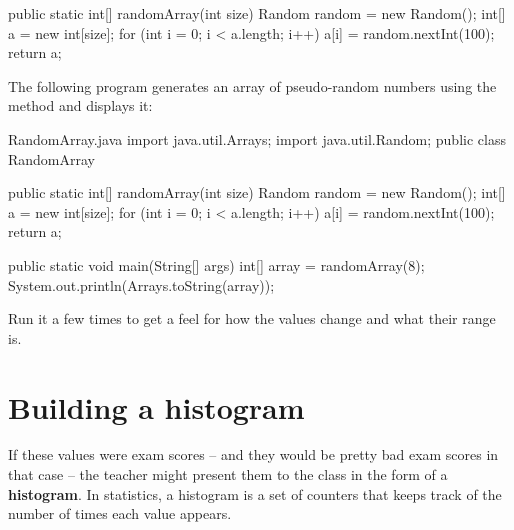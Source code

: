 \begin{code}
public static int[] randomArray(int size) {
    Random random = new Random();
    int[] a = new int[size];
    for (int i = 0; i < a.length; i++) {
        a[i] = random.nextInt(100);
    }
    return a;
}
\end{code}


%
%
%
The following program generates an array of pseudo-random numbers using the method  and displays it:

\begin{trinket} [320] {RandomArray.java}
import java.util.Arrays;
import java.util.Random;
public class RandomArray {

    public static int[] randomArray(int size) {
        Random random = new Random();
        int[] a = new int[size];
        for (int i = 0; i < a.length; i++) {
            a[i] = random.nextInt(100);
        }
        return a;
    }  
       
    public static void main(String[] args) {
       int[] array = randomArray(8);
       System.out.println(Arrays.toString(array));             
    }
}
\end{trinket}

Run it a few times to get a feel for how the values change and what their range is.

\section{Building a histogram}
\label{singlepass}


If these values were exam scores -- and they would be pretty bad exam scores in that case -- the teacher might present them to the class in the form of a {\bf histogram}.
In statistics, a histogram is a set of counters that keeps track of the number of times each value appears.

